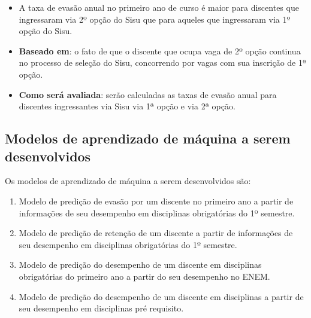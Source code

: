 \begin{enumerate}
	\begin{itemize}
	
		\item A taxa de evasão anual no primeiro ano de curso é maior para discentes que ingressaram via 2º opção do Sisu que para aqueles que ingressaram via 1º opção do Sisu.
		\item \textbf{Baseado em}: o fato de que o discente que ocupa vaga de 2º opção continua no processo de seleção do Sisu, concorrendo por vagas com sua inscrição de 1ª opção.
		\item \textbf{Como será avaliada}: serão calculadas as taxas de evasão anual para discentes ingressantes via Sisu via 1ª opção e via 2ª opção.
	\end{itemize}

\end{enumerate}

\subsection*{Modelos de aprendizado de máquina a serem desenvolvidos}

Os modelos de aprendizado de máquina a serem desenvolvidos são:

\begin{enumerate}

\item Modelo de predição de evasão por um discente no primeiro ano a partir de informações de seu desempenho em disciplinas obrigatórias do 1º semestre.

\item Modelo de predição de retenção de um discente a partir de informações de seu desempenho em disciplinas obrigatórias do 1º semestre.

\item Modelo de predição do desempenho de um discente em disciplinas obrigatórias do primeiro ano a partir do seu desempenho no ENEM.

\item Modelo de predição do desempenho de um discente em disciplinas a partir de seu desempenho em disciplinas pré requisito.

\end{enumerate}

